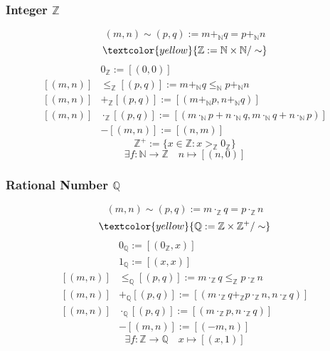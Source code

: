 \documentclass[UTF8,aspectratio=43,11pt,colorlinks,compress,openany]{beamer}%
\begin{document}
\begin{frame}\frametitle{Integer $\mathbb{Z}$}
	\[(m,n)\sim(p,q):=m+_{\mathbb{N}}q=p+_{\mathbb{N}}n\]
	\[\textcolor{yellow}{\mathbb{Z}:=\mathbb{N}\times\mathbb{N}/\sim}\]
	\begin{align*}
	&0_{\mathbb{Z}}:=[(0,0)]\\
	[(m,n)]&\leq_{\mathbb{Z}}[(p,q)]:=m+_{\mathbb{N}}q\leq_{\mathbb{N}}p+_{\mathbb{N}}n\\
	[(m,n)]&+_{\mathbb{Z}}[(p,q)]:=[(m+_{\mathbb{N}}p,n+_{\mathbb{N}}q)]\\
	[(m,n)]&\cdot_{\mathbb{Z}}[(p,q)]:=[(m\cdot_{\mathbb{N}}p+n\cdot_{\mathbb{N}}q, m\cdot_{\mathbb{N}}q+n\cdot_{\mathbb{N}}p)]\\
	&-[(m,n)]:=[(n,m)]
	\end{align*}
	\[\mathbb{Z}^+:=\{x\in\mathbb{Z}: x>_{\mathbb{Z}}0_{\mathbb{Z}}\}\]
	\[\exists f:\mathbb{N}\to\mathbb{Z}\quad n\mapsto[(n,0)]\]
\end{frame}

\begin{frame}\frametitle{Rational Number $\mathbb{Q}$}
	\[(m,n)\sim(p,q):=m\cdot_{\mathbb{Z}}q=p\cdot_{\mathbb{Z}}n\]
	\[\textcolor{yellow}{\mathbb{Q}:=\mathbb{Z}\times\mathbb{Z}^+/\sim}\]
	\begin{align*}
	&0_{\mathbb{Q}}:=[(0_{\mathbb{Z}},x)]\\
	&1_{\mathbb{Q}}:=[(x,x)]\\
	[(m,n)]&\leq_{\mathbb{Q}}[(p,q)]:=m\cdot_{\mathbb{Z}}q\leq_{\mathbb{Z}}p\cdot_{\mathbb{Z}}n\\
	[(m,n)]&+_{\mathbb{Q}}[(p,q)]:=[(m\cdot_{\mathbb{Z}}q+_{\mathbb{Z}}p\cdot_{\mathbb{Z}}n,n\cdot_{\mathbb{Z}}q)]\\
	[(m,n)]&\cdot_{\mathbb{Q}}[(p,q)]:=[(m\cdot_{\mathbb{Z}}p,n\cdot_{\mathbb{Z}}q)]\\
	&-[(m,n)]:=[(-m,n)]
	\end{align*}
	\[\exists f: \mathbb{Z}\to\mathbb{Q}\quad x\mapsto[(x,1)]\]
\end{frame}
\end{document}
